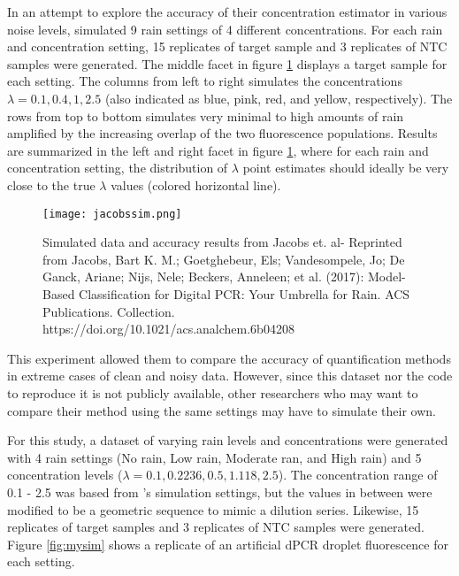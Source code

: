 In an attempt to explore the accuracy of their concentration estimator in various noise levels,  simulated 9 rain settings of 4 different concentrations. For each rain and concentration setting, 15 replicates of target sample and 3 replicates of NTC samples were generated. The middle facet in figure \ref{fig:jacobssim} displays a target sample for each setting. The columns from left to right simulates the concentrations \(\lambda = 0.1, 0.4, 1, 2.5\) (also indicated as blue, pink, red, and yellow, respectively). The rows from top to bottom simulates very minimal to high amounts of rain amplified by the increasing overlap of the two fluorescence populations. Results are summarized in the left and right facet in figure \ref{fig:jacobssim}, where for each rain and concentration setting, the distribution of \(\lambda\) point estimates should ideally be very close to the true \(\lambda\) values (colored horizontal line).

\begin{figure}[h]
    \centering
    \texttt{[image: jacobssim.png]}
    \caption[Simulated data and accuracy results from Jacobs et. al]{Simulated data and accuracy results from Jacobs et. al- Reprinted from Jacobs, Bart K. M.; Goetghebeur, Els; Vandesompele, Jo; De Ganck, Ariane; Nijs, Nele; Beckers, Anneleen; et al. (2017): Model-Based Classification for Digital PCR: Your Umbrella for Rain. ACS Publications. Collection. https://doi.org/10.1021/acs.analchem.6b04208}
        \label{fig:jacobssim}
\end{figure}

This experiment allowed them to compare the accuracy of quantification methods in extreme cases of clean and noisy data. However, since this dataset nor the code to reproduce it is not publicly available, other researchers who may want to compare their method using the same settings may have to simulate their own.

For this study, a dataset of varying rain levels and concentrations were generated with 4 rain settings (No rain, Low rain, Moderate ran, and High rain) and 5 concentration levels (\(\lambda = 0.1, 0.2236, 0.5, 1.118, 2.5\)). The concentration range of 0.1 - 2.5  was based from 's simulation settings, but the values in between were modified to be a geometric sequence to mimic a dilution series. Likewise, 15 replicates of target samples and 3 replicates of NTC samples were generated. Figure \ref{fig:mysim} shows a replicate of an artificial dPCR droplet fluorescence for each setting.

